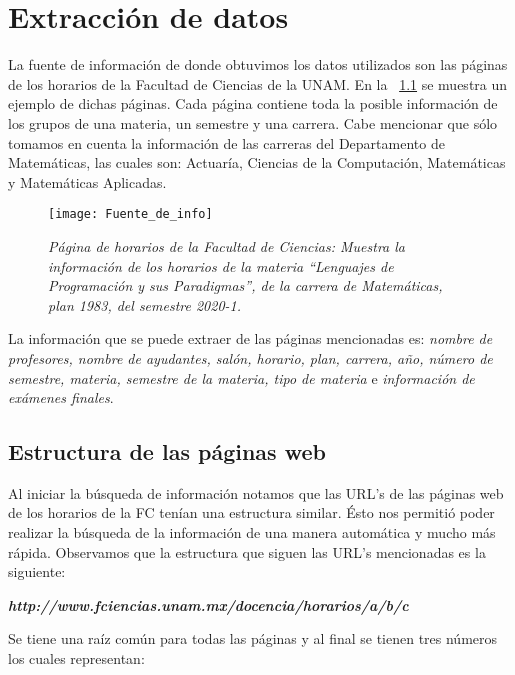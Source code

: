 \chapter{Extracción de datos}

La fuente de información de donde obtuvimos los datos utilizados son las páginas de los horarios de la Facultad de Ciencias de la UNAM. En la \figurename{~\ref{pagFC}} se muestra un ejemplo de dichas páginas. Cada página contiene toda la posible información de los grupos de una materia, un semestre y una carrera. Cabe mencionar que sólo tomamos en cuenta la información de las carreras del Departamento de Matemáticas, las cuales son: Actuaría, Ciencias de la Computación, Matemáticas y Matemáticas Aplicadas.

\begin{figure}[H]
\centering
\texttt{[image: Fuente\_de\_info]} %
\caption[\textit{Página de horarios de la Facultad de Ciencias}]{\textit{Página de horarios de la Facultad de Ciencias: Muestra la información de los horarios de la materia ``Lenguajes de Programación y sus Paradigmas'', de la carrera de Matemáticas, plan 1983, del semestre 2020-1.}}\label{pagFC}
\end{figure}

La información que se puede extraer de las páginas mencionadas es: \textit{nombre de profesores, nombre de ayudantes, salón, horario, plan, carrera, año, número de semestre, materia, semestre de la materia, tipo de materia} e \textit{información de exámenes finales}.


\section{Estructura de las páginas web}

Al iniciar la búsqueda de información notamos que las URL's de las páginas web de los horarios de la FC tenían una estructura similar. Ésto nos permitió poder realizar la búsqueda de la información de una manera automática y mucho más rápida. Observamos que la estructura que siguen las URL's mencionadas es la siguiente:

\begin{center}
\textit{\textbf{http://www.fciencias.unam.mx/docencia/horarios/a/b/c}}
\end{center}

Se tiene una raíz común para todas las páginas y al final se tienen tres números los cuales representan:

